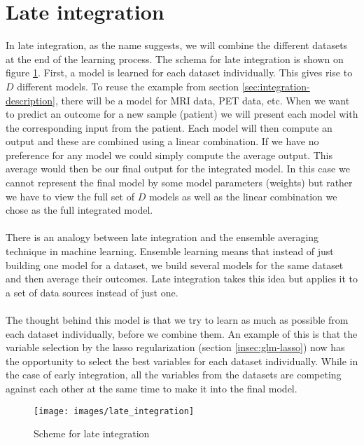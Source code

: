 \section{Late integration}
\label{sec:integration-late}
In late integration, as the name suggests, we will combine the different datasets at the end of the learning process. The schema for late integration is shown on figure \ref{fig:integration-late}. First, a model is learned for each dataset individually. This gives rise to $D$ different models. To reuse the example from section \ref{sec:integration-description}, there will be a model for MRI data, PET data, etc. When we want to predict an outcome for a new sample (patient) we will present each model with the corresponding input from the patient. Each model will then compute an output and these are combined using a linear combination. If we have no preference for any model we could simply compute the average output. This average would then be our final output for the integrated model. In this case we cannot represent the final model by some model parameters (weights) but rather we have to view the full set of $D$ models as well as the linear combination we chose as the full integrated model. \\ \\
There is an analogy between late integration and the ensemble averaging technique in machine learning. Ensemble learning\cite{dietterich2002ensemble}\cite{dietterich2000ensemble}\cite{wikiensemble} means that instead of just building one model for a dataset, we build several models for the same dataset and then average their outcomes. Late integration takes this idea but applies it to a set of data sources instead of just one. \\ \\
The thought behind this model is that we try to learn as much as possible from each dataset individually, before we combine them. An example of this is that the variable selection by the lasso regularization (section \ref{insec:glm-lasso}) now has the opportunity to select the best variables for each dataset individually. While in the case of early integration, all the variables from the datasets are competing against each other at the same time to make it into the final model.
\begin{figure}
	\centering
	\texttt{[image: images/late\_integration]}
	\caption{Scheme for late integration}
	\label{fig:integration-late}
\end{figure}
